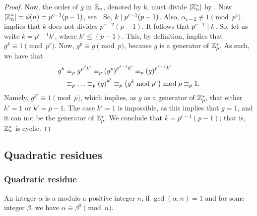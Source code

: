 \begin{proof}
    Now, the order of $g$ in $\mathbb{Z}_n$, denoted by $k$, must divide
    $\left| {\mathbb{Z}_n^*} \right|$\newline
    by . Now
    $\left| {\mathbb{Z}_n^*} \right| = \phi(n) = p^{c-1}(p-1)$, see
    .  So, $k \mid
    p^{c-1}(p-1)$. Also,
    $\alpha_{c-2} \nequiv 1 \pmod{p^{c}}$.
    implies that $k$ does not divides $p^{c-2}(p-1)$.  It follows that
    $p^{c-1} \mid k$. So, let us write $k = p^{c-1} k'$, where $k'
    \leq (p-1)$. This, by definition, implies that $g^{k} \equiv 1
    \pmod{p^c}$. Now, $g^p \equiv g \pmod{p}$, because $g$ is a
    generator of $\mathbb{Z}_p^*$. As such, we have that
    \begin{align*}
        g^{k}%
        &\equiv_p%
        g^{p^\delta k'} %
        \equiv_p%
        \pth[]{g^p}^{p^{\delta-1} k'} \equiv_p%
        \pth[]{g}^{p^{\delta-1} k'} \\
        &\equiv_p \ldots \equiv_p%
        \pth[]{g}^{k'} \equiv_p \pth[]{g^k \bmod{p^c}} \bmod{p}
        \equiv_p %
        1.
    \end{align*}
    Namely, $g^{k'} \equiv 1 \pmod{p}$, which implies, as $g$ as a
    generator of $\mathbb{Z}_p^*$, that either $k'=1$ or $k'=p-1$. The case
    $k'=1$ is impossible, as this implies that $g =1$, and it can not
    be the generator of $\mathbb{Z}_p^*$. We conclude that $k =
    p^{c-1}(p-1)$; that is, $\mathbb{Z}_n^*$ is cyclic.
\end{proof}

\subsection{Quadratic residues}
\subsubsection{Quadratic residue}

\begin{defn}
    An integer $\alpha$ is a  modulo a
    positive integer $n$, if $\gcd(\alpha, n)=1$ and for some integer
    $\beta$, we have $\alpha \equiv \beta^2 \pmod {n}$.
\end{defn}


